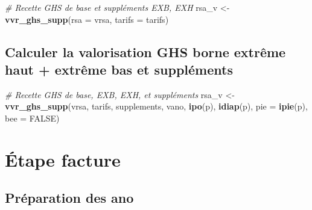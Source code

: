 \documentclass[]{book}
\newenvironment{Shaded}{\begin{snugshade}}{\end{snugshade}}
\newcommand{\CommentTok}[1]{\textcolor[rgb]{0.56,0.35,0.01}{\textit{#1}}}
\newcommand{\DataTypeTok}[1]{\textcolor[rgb]{0.13,0.29,0.53}{#1}}
\newcommand{\KeywordTok}[1]{\textcolor[rgb]{0.13,0.29,0.53}{\textbf{#1}}}
\newcommand{\NormalTok}[1]{#1}
\newcommand{\OtherTok}[1]{\textcolor[rgb]{0.56,0.35,0.01}{#1}}
\newcommand{\StringTok}[1]{\textcolor[rgb]{0.31,0.60,0.02}{#1}}
\begin{document}
\begin{Shaded}
\begin{Highlighting}[]
\CommentTok{# Recette GHS de base et suppléments EXB, EXH}
\NormalTok{rsa_v <-}\StringTok{ }\KeywordTok{vvr_ghs_supp}\NormalTok{(}\DataTypeTok{rsa =}\NormalTok{ vrsa, }\DataTypeTok{tarifs =}\NormalTok{ tarifs)}
\end{Highlighting}
\end{Shaded}

\hypertarget{calculer-la-valorisation-ghs-borne-extreme-haut-extreme-bas-et-supplements}{%
\subsection{Calculer la valorisation GHS borne extrême haut + extrême bas et suppléments}\label{calculer-la-valorisation-ghs-borne-extreme-haut-extreme-bas-et-supplements}}

\begin{Shaded}
\begin{Highlighting}[]
\CommentTok{# Recette GHS de base, EXB, EXH, et suppléments}
\NormalTok{rsa_v <-}\StringTok{ }\KeywordTok{vvr_ghs_supp}\NormalTok{(vrsa, tarifs, supplements, vano, }\KeywordTok{ipo}\NormalTok{(p), }\KeywordTok{idiap}\NormalTok{(p), }\DataTypeTok{pie =} \KeywordTok{ipie}\NormalTok{(p), }\DataTypeTok{bee =} \OtherTok{FALSE}\NormalTok{)}
\end{Highlighting}
\end{Shaded}

\hypertarget{etape-facture}{%
\section{Étape facture}\label{etape-facture}}

\hypertarget{preparation-des-ano}{%
\subsection{Préparation des ano}\label{preparation-des-ano}}
\end{document}
